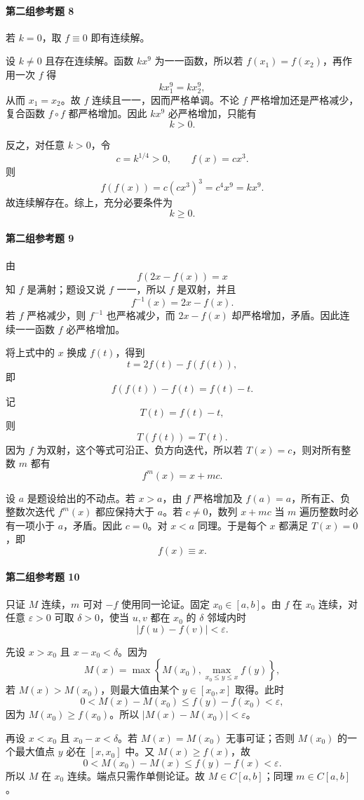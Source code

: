 \paragraph{第二组参考题 8}
\begin{xsolution}
若 $k=0$，取 $f\equiv0$ 即有连续解。

设 $k\ne0$ 且存在连续解。函数 $kx^9$ 为一一函数，所以若 $f(x_1)=f(x_2)$，再作用一次 $f$ 得
\[
 kx_1^9=kx_2^9,
\]
从而 $x_1=x_2$。故 $f$ 连续且一一，因而严格单调。不论 $f$ 严格增加还是严格减少，复合函数 $f\circ f$ 都严格增加。因此 $kx^9$ 必严格增加，只能有
\[
 k>0.
\]

反之，对任意 $k>0$，令
\[
 c=k^{1/4}>0,
 \qquad f(x)=cx^3.
\]
则
\[
 f(f(x))=c(cx^3)^3=c^4x^9=kx^9.
\]
故连续解存在。综上，充分必要条件为
\[
 \boxed{k\ge0}.
\]
\end{xsolution}

\paragraph{第二组参考题 9}
\begin{xsolution}
由
\[
 f(2x-f(x))=x
\]
知 $f$ 是满射；题设又说 $f$ 一一，所以 $f$ 是双射，并且
\[
 f^{-1}(x)=2x-f(x).
\]
若 $f$ 严格减少，则 $f^{-1}$ 也严格减少，而 $2x-f(x)$ 却严格增加，矛盾。因此连续一一函数 $f$ 必严格增加。

将上式中的 $x$ 换成 $f(t)$，得到
\[
 t=2f(t)-f(f(t)),
\]
即
\[
 f(f(t))-f(t)=f(t)-t.
\]
记
\[
 T(t)=f(t)-t,
\]
则
\[
 T(f(t))=T(t).
\]
因为 $f$ 为双射，这个等式可沿正、负方向迭代，所以若 $T(x)=c$，则对所有整数 $m$ 都有
\[
 f^m(x)=x+mc.
\]

设 $a$ 是题设给出的不动点。若 $x>a$，由 $f$ 严格增加及 $f(a)=a$，所有正、负整数次迭代 $f^m(x)$ 都应保持大于 $a$。若 $c\ne0$，数列 $x+mc$ 当 $m$ 遍历整数时必有一项小于 $a$，矛盾。因此 $c=0$。对 $x<a$ 同理。于是每个 $x$ 都满足 $T(x)=0$，即
\[
 f(x)\equiv x.
\]
\end{xsolution}

\paragraph{第二组参考题 10}
\begin{xsolution}
只证 $M$ 连续，$m$ 可对 $-f$ 使用同一论证。固定 $x_0\in[a,b]$。由 $f$ 在 $x_0$ 连续，对任意 $\varepsilon>0$ 可取 $\delta>0$，使当 $u,v$ 都在 $x_0$ 的 $\delta$ 邻域内时
\[
 |f(u)-f(v)|<\varepsilon.
\]

先设 $x>x_0$ 且 $x-x_0<\delta$。因为
\[
 M(x)=\max\left\{M(x_0),\max_{x_0\le y\le x}f(y)\right\},
\]
若 $M(x)>M(x_0)$，则最大值由某个 $y\in[x_0,x]$ 取得。此时
\[
 0<M(x)-M(x_0)
 \le f(y)-f(x_0)<\varepsilon,
\]
因为 $M(x_0)\ge f(x_0)$。所以 $|M(x)-M(x_0)|<\varepsilon$。

再设 $x<x_0$ 且 $x_0-x<\delta$。若 $M(x)=M(x_0)$ 无事可证；否则 $M(x_0)$ 的一个最大值点 $y$ 必在 $[x,x_0]$ 中。又 $M(x)\ge f(x)$，故
\[
 0<M(x_0)-M(x)
 \le f(y)-f(x)<\varepsilon.
\]
所以 $M$ 在 $x_0$ 连续。端点只需作单侧论证。故 $M\in C[a,b]$；同理 $m\in C[a,b]$。
\end{xsolution}

